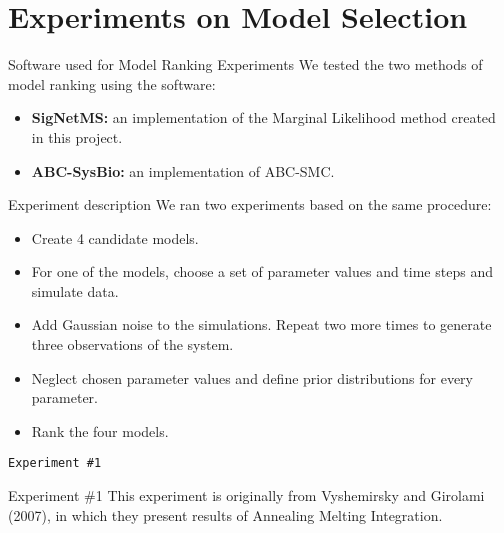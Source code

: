\documentclass{beamer}
\begin{document}
\section{Experiments on Model Selection}

\begin{frame}{Software used for Model Ranking Experiments}
We tested the two methods of model ranking using the software:
\pause
\begin{itemize}
\item{{\bf SigNetMS:} an implementation of the Marginal Likelihood 
    method created in this project.}
\pause
\item{{\bf ABC-SysBio:} an implementation of ABC-SMC.}
\end{itemize}
\end{frame}


\begin{frame}{Experiment description}
We ran two experiments based on the same procedure:
\begin{itemize}
    \pause
    \item{Create 4 candidate models.}
    \pause
    \item{For one of the models, choose a set of parameter values 
        and time steps and simulate data.}
    \pause
    \item{Add Gaussian noise to the simulations. Repeat two more 
        times to generate three observations of the system.}
    \pause
    \item{Neglect chosen parameter values and define prior distributions
        for every parameter.}
    \pause
    \item{Rank the four models.}
\end{itemize}
\end{frame}


\begin{frame}{}
\begin{center}
    \texttt{Experiment \#1}
\end{center}
\end{frame}


\begin{frame}{Experiment \#1}
This experiment is originally from Vyshemirsky and Girolami (2007), in 
which they present results of Annealing Melting Integration. 
\end{frame}
\end{document}
